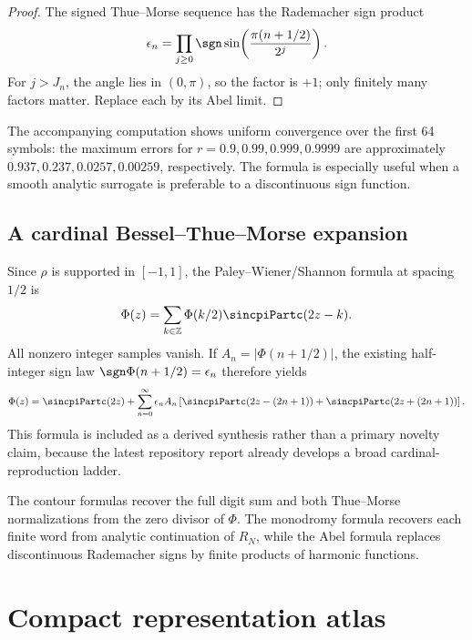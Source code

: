 \documentclass[11pt,oneside]{article}
\theoremstyle{definition}
\newcommand{\Z}{\mathbb Z}
\begin{document}
\begin{proof}
The signed Thue--Morse sequence has the Rademacher sign product
\[
 \epsilon_n=\prod_{j\ge0}\sgn\sin\!\left(\frac{\pi(n+1/2)}{2^j}\right).
\]
For \(j>J_n\), the angle lies in \((0,\pi)\), so the factor is \(+1\); only finitely many
factors matter. Replace each by its Abel limit.
\end{proof}

The accompanying computation shows uniform convergence over the first 64 symbols: the
maximum errors for \(r=0.9,0.99,0.999,0.9999\) are approximately
\(0.937,0.237,0.0257,0.00259\), respectively. The formula is especially useful when a smooth
analytic surrogate is preferable to a discontinuous sign function.

\subsection{A cardinal Bessel--Thue--Morse expansion}

Since \(\rho\) is supported in \([-1,1]\), the Paley--Wiener/Shannon formula at spacing
\(1/2\) is
\begin{equation}
 \Phi(z)=\sum_{k\in\Z}\Phi(k/2)\sincpiPartc(2z-k).
 \label{p4:eq:Shannon-Phi}
\end{equation}
All nonzero integer samples vanish. If
\(A_n=|\Phi(n+1/2)|\), the existing half-integer sign law
\(\sgn\Phi(n+1/2)=\epsilon_n\) therefore yields
\begin{equation}
 \Phi(z)=\sincpiPartc(2z)+\sum_{n=0}^{\infty}\epsilon_nA_n
 \left[\sincpiPartc(2z-(2n+1))+\sincpiPartc(2z+(2n+1))\right].
 \label{p4:eq:Shannon-TM}
\end{equation}
This formula is included as a derived synthesis rather than a primary novelty claim, because
the latest repository report already develops a broad cardinal-reproduction ladder.

\begin{novelbox}
The contour formulas recover the full digit sum and both Thue--Morse normalizations from the
zero divisor of \(\Phi\). The monodromy formula recovers each finite word from analytic
continuation of \(R_N\), while the Abel formula replaces discontinuous Rademacher signs by
finite products of harmonic functions.
\end{novelbox}

\section{Compact representation atlas}
\label{p4:sec:atlas}
\end{document}
